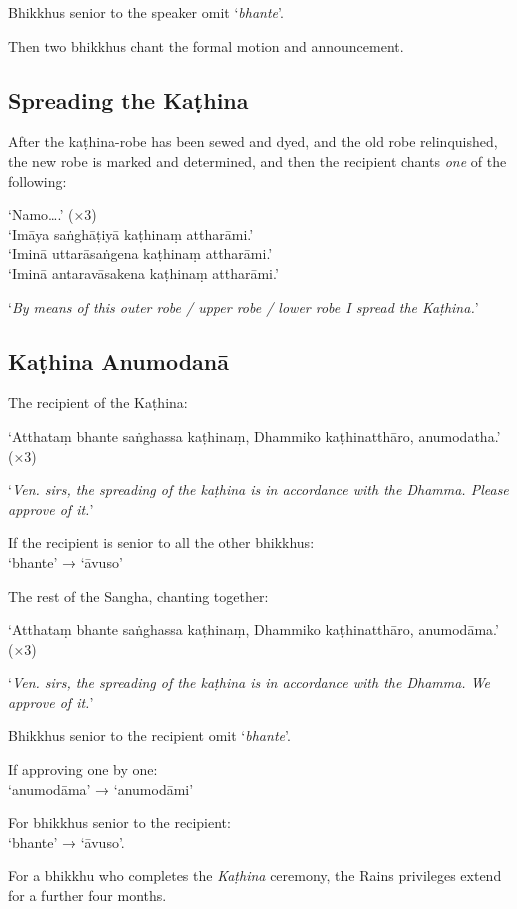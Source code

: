 Bhikkhus senior to the speaker omit ‘\emph{bhante}’.

Then two bhikkhus chant the formal motion and announcement.


\subsection{Spreading the Kaṭhina}

After the kaṭhina-robe has been sewed and dyed, and the old robe relinquished,
the new robe is marked and determined, and then the recipient chants \emph{one}
of the following:

‘Namo….’ (×3)\\
‘Imāya saṅghāṭiyā kaṭhinaṃ attharāmi.’\\
‘Iminā uttarāsaṅgena kaṭhinaṃ attharāmi.’\\
‘Iminā antaravāsakena kaṭhinaṃ attharāmi.’

‘\emph{By means of this outer robe / upper robe / lower robe I spread the Kaṭhina.}’


\subsection{Kaṭhina Anumodanā}

The recipient of the Kaṭhina:

‘Atthataṃ bhante saṅghassa kaṭhinaṃ, Dhammiko kaṭhinatthāro, anumodatha.’ (×3)

‘\emph{Ven. sirs, the spreading of the kaṭhina is in accordance with the Dhamma.
  Please approve of it.}’

If the recipient is senior to all the other bhikkhus:\\
‘bhante’ → ‘āvuso’

The rest of the Sangha, chanting together:

‘Atthataṃ bhante saṅghassa kaṭhinaṃ, Dhammiko kaṭhinatthāro, anumodāma.’ (×3)

‘\emph{Ven. sirs, the spreading of the kaṭhina is in accordance with the Dhamma.
  We approve of it.}’


Bhikkhus senior to the recipient omit ‘\emph{bhante}’.

If approving one by one:\\
‘anumodāma’ → ‘anumodāmi’

For bhikkhus senior to the recipient:\\
‘bhante’ → ‘āvuso’.

For a bhikkhu who completes the \emph{Kaṭhina} ceremony, the Rains privileges
extend for a further four months.


